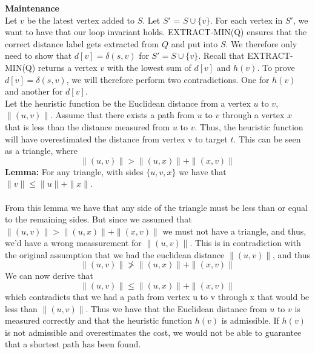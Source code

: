 \documentclass[11pt]{article}
\begin{document}
\noindent \textbf{Maintenance}\\
Let $v$ be the latest vertex added to $S$. Let $S'$ = $S \cup \{v\}$. For each vertex in $S'$, we want to have that our loop invariant holds. EXTRACT-MIN(Q) ensures that the correct distance label gets extracted from $Q$ and put into $S$. We therefore only need to show that $d[v]=\delta(s,v)$ for $S'=S \cup \{v\}$. Recall that EXTRACT-MIN(Q) returns a vertex $v$ with the lowest sum of $d[v]$ and $h(v)$. To prove $d[v]=\delta(s,v)$, we will therefore perform two contradictions. One for $h(v)$ and another for $d[v]$.\\

\noindent Let the heuristic function be the Euclidean distance from a vertex $u$ to $v$, $\|(u,v)\|$. Assume that there exists a path from $u$ to $v$ through a vertex $x$ that is less than the distance measured from $u$ to $v$. Thus, the heuristic function will have overestimated the distance from vertex v to target $t$. This can be seen as a triangle, where $$\|(u,v)\| > \|(u,x)\| + \|(x,v)\|$$\textbf{Lemma:} For any triangle, with sides $\{u,v,x\}$ we have that $\|v\| \leq \|u\| + \|x\|$.\\\\ From this lemma we have that any side of the triangle must be less than or equal to the remaining sides. But since we assumed that $\|(u,v)\| > \|(u,x)\| + \|(x,v)\|$ we must not have a triangle, and thus, we'd have a wrong meassurement for $\|(u,v)\|$. This is in contradiction with the original assumption that we had the euclidean distance $\|(u,v)\|$, and thus $$\|(u,v)\| \not > \|(u,x)\| + \|(x,v)\|$$
We can now derive that $$\|(u,v)\| \leq \|(u,x)\| + \|(x,v)\|$$which contradicts that we had a path from vertex u to v through x that would be less than $\|(u,v)\|$. Thus we have that the Euclidean distance from $u$ to $v$ is measured correctly and that the heuristic function $h(v)$ is admissible. If $h(v)$ is not admissible and  overestimates the cost, we would not be able to guarantee that a shortest path has been found. \\
\end{document}
